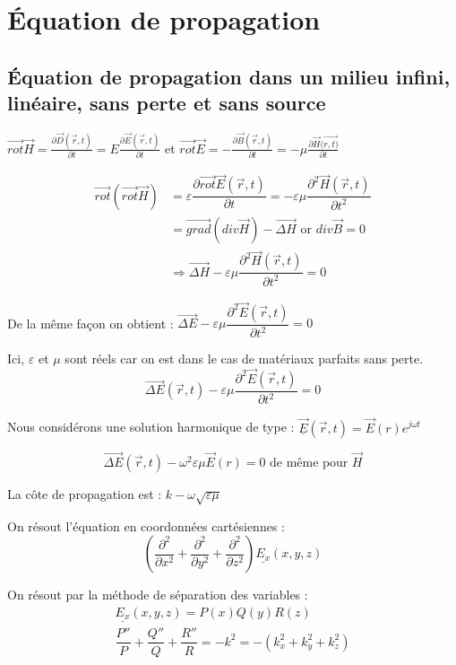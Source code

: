\documentclass[12pt,a4paper]{report}
\begin{document}
\section{Équation de propagation}

\subsection{Équation de propagation dans un milieu infini, linéaire, sans perte et sans source}

\(\vec{rot} \vec{H} = \frac{\partial \vec{D}(\vec{r}, t)}{\partial t} = E \frac{\partial \vec{E}(\vec{r}, t)}{\partial t}\) et \(\vec{rot} \vec{E} = - \frac{\partial \vec{B}(\vec{r}, t)}{\partial t} = - \mu \frac{\partial \vec{H}(\vec{r,t)}}{\partial t}\)

\begin{align*}
	\vec{rot} \left( \vec{rot} \vec{H} \right) &= \varepsilon \dfrac{\partial \vec{rot} \vec{E}(\vec{r}, t)}{\partial t} = - \varepsilon \mu \dfrac{\partial^2 \vec{H}(\vec{r}, t)}{\partial t^2}\\
	&= \vec{grad}\left(div \vec{H}\right) - \vec{\Delta H} \text{ or } div \vec{B} = 0\\
	&\Rightarrow \vec{\Delta H} - \varepsilon \mu \dfrac{\partial^2 \vec{H}(\vec{r}, t)}{\partial t^2} = 0
\end{align*}

De la même façon on obtient : \(\vec{\Delta E} - \varepsilon \mu \dfrac{\partial^2 \vec{E}(\vec{r}, t)}{\partial t^2} = 0\)

Ici, \(\varepsilon\) et \(\mu\) sont réels car on est dans le cas de matériaux parfaits sans perte.
\[
	\vec{\Delta E}(\vec{r}, t) - \varepsilon \mu \dfrac{\partial^2 \vec{E}(\vec{r}, t)}{\partial t^2} = 0
\]

Nous considérons une solution harmonique de type : \(\underline{\vec{E}}(\vec{r}, t) = \vec{E}(r) e^{j\omega t}\)

\[
	\vec{\Delta E}(\vec{r}, t) - \omega^2 \varepsilon \mu \vec{E} (r) = 0 \text{ de même pour } \vec{H}
\]

La côte de propagation est : \(k - \omega \sqrt{\varepsilon \mu}\)

On résout l'équation en coordonnées cartésiennes : 
\[
	\left( \dfrac{\partial^2}{\partial x^2} + \dfrac{\partial^2}{\partial y^2} + \dfrac{\partial^2}{\partial z^2} \right) \underline{E_x}(x, y, z)
\]

On résout par la méthode de séparation des variables :
\begin{align*}
	\underline{E_x}(x, y, z) = P(x) Q(y) R(z)\\
	\dfrac{P''}{P} + \dfrac{Q''}{Q} + \dfrac{R''}{R} = -k^2 = - (k_x^2 + k_y^2 + k_z^2)
\end{align*}
\end{document}
